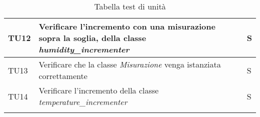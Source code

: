 \begin{longtable}{|C{1.9cm}|L{5.5cm}|C{2cm}|}
    TU12 & Verificare l'incremento con una misurazione sopra la soglia,  della classe \textit{humidity\_incrementer} & S \\
    \hline

    TU13 & Verificare che la classe \textit{Misurazione} venga istanziata correttamente & S \\
    \hline

    TU14 & Verificare l'incremento della classe \textit{temperature\_incrementer} & S \\
    \hline

    \caption{Tabella test di unità}
\end{longtable}
